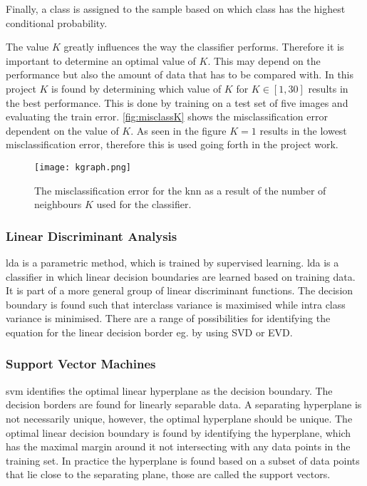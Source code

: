 Finally, a class is assigned to the sample based on which class has the highest conditional probability.

The value $K$ greatly influences the way the classifier performs. Therefore it is important to determine an optimal value of $K$. This may depend on the performance but also the amount of data that has to be compared with. In this project $K$ is found by determining which value of $K$ for $K\in[1,30]$ results in the best performance. This is done by training on a test set of five images and evaluating the train error. \autoref{fig:misclassK} shows the misclassification error dependent on the value of $K$. As seen in the figure $K=1$ results in the lowest misclassification error, therefore this is used going forth in the project work.  
 \begin{figure}[H]
\centering
\texttt{[image: kgraph.png]}
\caption{The misclassification error for the \gls{knn} as a result of the number of neighbours $K$ used for the classifier.}
\label{fig:misclassK}
\end{figure}
\subsubsection*{Linear Discriminant Analysis}
\gls{lda} is a parametric method, which is trained by supervised learning. \gls{lda} is a classifier in which linear decision boundaries are learned based on training data. It is part of a more general group of linear discriminant functions. The decision boundary is found such that interclass variance is maximised while intra class variance is minimised. There are a range of possibilities for identifying the equation for the linear decision border eg. by using SVD or EVD.    

\subsubsection*{Support Vector Machines}
\gls{svm} identifies the optimal linear hyperplane as the decision boundary. The decision borders are found for linearly separable data. A separating hyperplane is not necessarily unique, however, the optimal hyperplane should be unique. The optimal linear decision boundary is found by identifying the hyperplane, which has the maximal margin around it not intersecting with any data points in the training set.
In practice the hyperplane is found based on a subset of data points that lie close to the separating plane, those are called the support vectors.    

